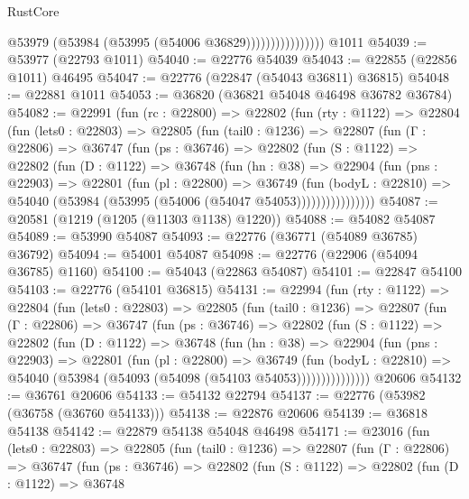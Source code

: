 \begin{lexlean}{RustCore}
\begin{coremodule}
                            @53979 (@53984 (@53995 (@54006 @36829))))))))))))))))
    @1011
@54039 := @53977 (@22793 @1011)
@54040 := @22776 @54039
@54043 := @22855 (@22856 @1011) @46495
@54047 := @22776 (@22847 (@54043 @36811) @36815)
@54048 := @22881 @1011
@54053 := @36820 (@36821 @54048 @46498 @36782 @36784)
@54082 := @22991
    (fun (rc : @22800) =>
    @22802
      (fun (rty : @1122) =>
      @22804
        (fun (lets0 : @22803) =>
        @22805
          (fun (tail0 : @1236) =>
          @22807
            (fun (Γ : @22806) =>
            @36747
              (fun (ps : @36746) =>
              @22802
                (fun (S : @1122) =>
                @22802
                  (fun (D : @1122) =>
                  @36748
                    (fun (hn : @38) =>
                    @22904
                      (fun (pns : @22903) =>
                      @22801
                        (fun (pl : @22800) =>
                        @36749
                          (fun (bodyL : @22810) =>
                          @54040 (@53984 (@53995 (@54006 (@54047 @54053))))))))))))))))
@54087 := @20581 (@1219 (@1205 (@11303 @1138) @1220))
@54088 := @54082 @54087
@54089 := @53990 @54087
@54093 := @22776 (@36771 (@54089 @36785) @36792)
@54094 := @54001 @54087
@54098 := @22776 (@22906 (@54094 @36785) @1160)
@54100 := @54043 (@22863 @54087)
@54101 := @22847 @54100
@54103 := @22776 (@54101 @36815)
@54131 := @22994
    (fun (rty : @1122) =>
    @22804
      (fun (lets0 : @22803) =>
      @22805
        (fun (tail0 : @1236) =>
        @22807
          (fun (Γ : @22806) =>
          @36747
            (fun (ps : @36746) =>
            @22802
              (fun (S : @1122) =>
              @22802
                (fun (D : @1122) =>
                @36748
                  (fun (hn : @38) =>
                  @22904
                    (fun (pns : @22903) =>
                    @22801
                      (fun (pl : @22800) =>
                      @36749
                        (fun (bodyL : @22810) =>
                        @54040 (@53984 (@54093 (@54098 (@54103 @54053)))))))))))))))
    @20606
@54132 := @36761 @20606
@54133 := @54132 @22794
@54137 := @22776 (@53982 (@36758 (@36760 @54133)))
@54138 := @22876 @20606
@54139 := @36818 @54138
@54142 := @22879 @54138 @54048 @46498
@54171 := @23016
    (fun (lets0 : @22803) =>
    @22805
      (fun (tail0 : @1236) =>
      @22807
        (fun (Γ : @22806) =>
        @36747
          (fun (ps : @36746) =>
          @22802
            (fun (S : @1122) =>
            @22802
              (fun (D : @1122) =>
              @36748

\end{coremodule}
\end{lexlean}
